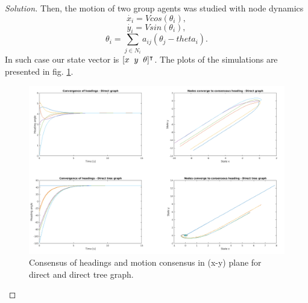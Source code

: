 \documentclass[12pt]{article}
\newenvironment{solution}{\begin{proof}[Solution]}{\end{proof}}
\begin{document}
\begin{solution}
Then, the motion of two group agents was studied with node dynamics
\begin{equation*}
\dot{x_i}=Vcos(\theta_i),
\end{equation*}
\begin{equation*}
\dot{y_i}=Vsin(\theta_i),
\end{equation*}
\begin{equation*}
\theta_i = \sum_{j \in N_i}a_{ij}(\theta_j-theta_i).
\end{equation*}
In such case our state vector is $[x \hspace{.2cm} y \hspace{.2cm} \theta]^{\intercal}$. The plots of the simulations are presented in fig. \ref{cswarm}.
\begin{figure}[!h]
	\includegraphics[scale=0.315]{figures/ConsensusSwarm.png}
	\centering
	\caption{Consensus of headings and motion consensus in (x-y) plane for direct and direct tree graph.}
	\label{cswarm}
\end{figure}

 

\end{solution}
\end{document}
